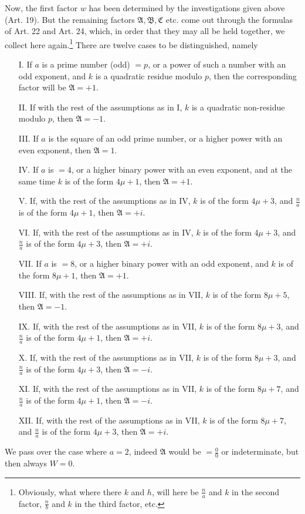 \documentclass{book}
\theoremstyle{plain}
\theoremstyle{remark}
\begin{document}
Now, the first factor $w$ has been determined by the investigations given above (Art. 19).  But the remaining factors $\mathfrak{A}, \mathfrak{B}, \mathfrak{C} $ etc. come out through the formulas of Art. 22 and Art. 24, which, in order that they may all be held together, we collect here again.\footnote{Obviously, what where there $k$ and $h$, will here be $\frac{n}{a}$ and $k$ in the second factor, $\frac{n}{b}$ and $k$ in the third factor, etc.}   There are twelve cases to be distinguished, namely
\begin{enumerate}
\item[I.] If $a$ is a prime number (odd) $=p$, or a power of such a number with an odd exponent, and $k$ is a quadratic residue modulo $p$, then the corresponding factor will be $\mathfrak{A} = +1$.
\item[II.] If with the rest of the assumptions as in I, $k$ is a quadratic non-residue modulo $p$, then $\mathfrak{A} = -1$. 
\item[III.] If $a$ is the square of an odd prime number, or a higher power with an even exponent, then $\mathfrak{A} = 1$. 
\item[IV.] If $a$ is $=4$, or a higher binary power with an even exponent, and at the same time $k$ is of the form $4\mu+1$, then $\mathfrak{A} = +1$. 
\item[V.] If, with the rest of the assumptions as in IV, $k$ is of the form $4\mu+3$, and $\frac{n}{a}$ is of the form $4\mu+1$, then $\mathfrak{A} = +i$.
\item[VI.] If, with the rest of the assumptions as in IV, $k$ is of the form $4\mu+3$, and $\frac{n}{a}$ is of the form $4\mu+3$, then $\mathfrak{A} = +i$.
\item[VII.] If $a$ is $=8$, or a higher binary power with an odd exponent, and $k$ is of the form $8\mu+1$, then $\mathfrak{A} = +1$.
\item[VIII.] If, with the rest of the assumptions as in VII, $k$ is of the form $8\mu+5$, then $\mathfrak{A} = -1$.
\item[IX.] If, with the rest of the assumptions as in VII, $k$ is of the form $8\mu+3$, and $\frac{n}{a}$ is of the form $4\mu+1$, then $\mathfrak{A} = +i$.
\item[X.] If, with the rest of the assumptions as in VII, $k$ is of the form $8\mu+3$, and $\frac{n}{a}$ is of the form $4\mu+3$, then $\mathfrak{A} = -i$.
\item[XI.] If, with the rest of the assumptions as in VII, $k$ is of the form $8\mu+7$, and $\frac{n}{a}$ is of the form $4\mu+1$, then $\mathfrak{A} = -i$.
\item[XII.] If, with the rest of the assumptions as in VII, $k$ is of the form $8\mu+7$,  and $\frac{n}{a}$ is of the form $4\mu+3$, then $\mathfrak{A} = +i$.
\end{enumerate}
We pass over the case where $a=2$, indeed $\mathfrak{A}$ would be $= \frac{0}{0}$ or indeterminate, but then always $W = 0$. 
\end{document}
